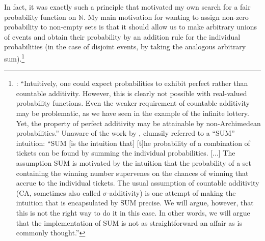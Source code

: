 In fact, it was exactly such a principle that motivated my own search for a fair probability function on $\mathbb{N}$.
My main motivation for wanting to assign non-zero probability to non-empty sets is that it should allow us to make arbitrary unions of events and obtain their probability by an addition rule for the individual probabilities (in the case of disjoint events, by taking the analogous arbitrary sum).\footnote{\citet[p.~36]{Wenmackers:2011a}: ``Intuitively, one could expect probabilities to exhibit perfect rather than countable additivity. However, this is clearly not possible with real-valued probability functions. Even the weaker requirement of countable additivity may be problematic, as we have seen in the example of the infinite lottery. Yet, the property of perfect additivity may be attainable by non-Archimedean probabilities.'' Unaware of the work by \citet{Skyrms:1983a}, \citet[p.~40]{WenmackersHorsten:2013} clumsily referred to a ``SUM'' intuition: ``SUM [is the intuition that] [t]he probability of a combination of tickets can be found by summing the individual probabilities. [...] The assumption SUM is motivated by the intuition that the probability of a set containing the winning number supervenes on the chances of winning that accrue to the individual tickets. The usual assumption of countable additivity (CA, sometimes also called $\sigma$-additivity) is one attempt of making the intuition that is encapsulated by SUM precise. We will argue, however, that this is not the right way to do it in this case. In other words, we will argue that the implementation of SUM is not as straightforward an affair as is commonly thought.''}

